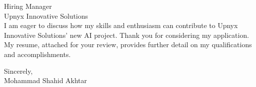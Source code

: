 \documentclass[10.5pt]{letter}
\begin{document}
\begin{letter}{Hiring Manager\\Upnyx Innovative Solutions\\}
\vspace{0.5cm}
I am eager to discuss how my skills and enthusiasm can contribute to Upnyx Innovative Solutions' new AI project. Thank you for considering my application. My resume, attached for your review, provides further detail on my qualifications and accomplishments.

\vspace{0.5cm}

\begin{flushleft}
\vspace{0.3cm}
Sincerely,\\[2ex]
Mohammad Shahid Akhtar
\end{flushleft}

\end{letter}
\end{document}
